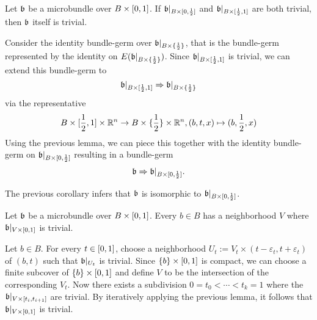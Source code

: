 \begin{scope}
\newcommand{\A}[1][] {
    A_\alpha#1
}

\newcommand{\bbleft} {
    \bb\restr{B \times{} [0, \half]}
}
\newcommand{\bbright} {
    \bb\restr{B \times{} [\half, 1]}
}
\newcommand{\bbhalf} {
    \bb\restr{B \times{} \{ \half \}}
}

\begin{mylemma}\label{homotopy::lemma1}
    Let $\mathfrak{b}$ be a microbundle over $B \times [0, 1]$. If $\bbleft$ and $\bbright$ are both trivial,
    then $\mathfrak{b}$ itself is trivial.
\end{mylemma}
\begin{myproof}
    Consider the identity bundle-germ over $\bbhalf$, that is the bundle-germ represented by the identity on $E(\bbhalf)$.
    Since $\bbright$ is trivial, we can extend this bundle-germ to 
    \[ \bbright \double \bbhalf \]
    via the representative
    \[ B \times [\frac{1}{2}, 1] \times \mathbb{R}^n \to B \times \{\frac{1}{2}\} \times \mathbb{R}^n, (b, t, x) \mapsto (b, \frac{1}{2}, x) \]
    Using the previous lemma, we can piece this together with the identity bundle-germ on $\bbleft$ resulting in a bundle-germ
    \[ \bb \double \bbleft. \]

    The previous corollary infers that $\mathfrak{b}$ is isomorphic to $\bbleft$.
\end{myproof}

\begin{mylemma}\label{homotopy::lemma2}
    Let $\mathfrak{b}$ be a microbundle over $B \times [0, 1]$.
    Every $b \in B$ has a neighborhood $V$ where $\mathfrak{b}\vert_{V \times [0, 1]}$ is trivial.
\end{mylemma}
\begin{myproof}
    Let $b \in B$.
    For every $t \in [0, 1]$, choose a neighborhood $U_t := V_t \times (t - \varepsilon_t, t + \varepsilon_t)$ of $(b, t)$ such that $\mathfrak{b}\vert_{U_t}$ is trivial.
    Since $\{b\} \times [0, 1]$ is compact, we can choose a finite subcover of $\{b\} \times [0, 1]$ and define $V$ to be the intersection of the corresponding $V_t$.
    Now there exists a subdivision $0 = t_0 < \cdots < t_k = 1$ where the $\mathfrak{b}\vert_{V \times [t_{i}, t_{i + 1}]}$ are trivial.
    By iteratively applying the previous lemma, it follows that $\mathfrak{b}\vert_{V \times [0, 1]}$ is trivial.
\end{myproof}


\end{scope}
